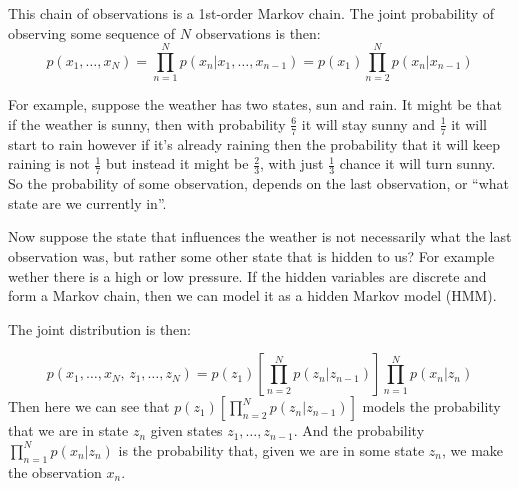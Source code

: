     This chain of observations is a 1st-order Markov chain. The joint 
    probability of observing some sequence of $N$ observations is then:
    \begin{equation*}
        p(x_1,\dots,x_N)=\prod_{n=1}^{N}p(x_n|x_1,\dots,x_{n-1}) = 
        p(x_1)\prod_{n=2}^{N}p(x_n|x_{n-1})
    \end{equation*}
    
    For example, suppose the weather has two states, sun and rain. It might be 
    that if the weather is sunny, then with probability $\frac{6}{7}$ it will 
    stay sunny and $\frac{1}{7}$ it will start to rain however if it's already 
    raining then the probability that it will keep raining is not $\frac{1}{7}$ 
    but instead it might be $\frac{2}{3}$, with just $\frac{1}{3}$ chance it 
    will turn sunny. So the probability of some observation, depends on the 
    last observation, or ``what state are we currently in''.
    
    Now suppose the state that influences the weather is not necessarily what 
    the last observation was, but rather some other state that is hidden to us? 
    For example wether there is a high or low pressure. If the hidden variables 
    are discrete and form a Markov chain, then we can model it as a hidden 
    Markov model (HMM).
    
    
    The joint distribution is then:
    
    \begin{equation*}
        p(x_1,\dots,x_N,\,z_1,\dots,z_N) = 
        p(z_1)\left[\prod_{n=2}^{N}p(z_n|z_{n-1})\right] 
        \prod_{n=1}^{N}p(x_n|z_n)
    \end{equation*}
    Then here we can see that 
    $p(z_1)\left[\prod_{n=2}^{N}p(z_n|z_{n-1})\right]$ models the probability 
    that we are in state $z_n$ given states $z_1,\dots,z_{n-1}$. And the 
    probability $\prod_{n=1}^{N}p(x_n|z_n)$ is the probability that, given we 
    are in some state $z_n$, we make the observation $x_n$.
    
